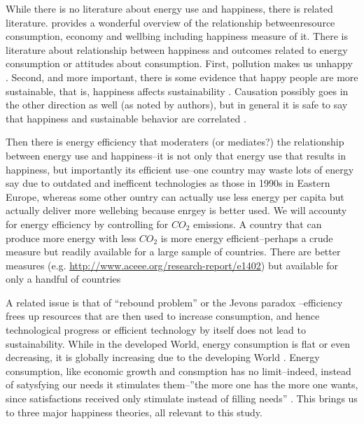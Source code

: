 \documentclass[10pt, letterpaper]{article}
\begin{document}
\begin{spacing}{1.4}
While there is no literature about energy use and happiness, there is related
literature. \citet{pretty13} provides a wonderful overview of the relationship
betweenresource consumption, economy and wellbing including happiness measure of
it. There is literature about relationship between happiness and outcomes
related to energy consumption or attitudes about consumption. First, pollution makes us unhappy \citep{weinhold12,welsch05}. Second,
and more important,  there is some evidence that happy people
are more sustainable, that is, happiness affects sustainability
\citep{ericson14}.  Causation possibly goes in the
other direction as well (as noted by authors), but in general it is
safe to say that happiness and sustainable behavior are correlated  \citep{brown05,corral11}.

Then there is energy efficiency that moderaters (or mediates?) the relationship
between energy use and happiness--it is not only that energy use that results in
happiness, but importantly its efficient use--one country may waste lots of
energy say due to outdated and inefficent technologies as those in 1990s in
Eastern Europe, whereas some other ountry can actually use less energy per
capita but actually deliver more wellebing because enrgey is better used. We
will accounty for  energy efficiency by controlling for  $CO_2$ emissions. 
 A country that can produce more energy with less $CO_2$ is more energy
 efficient--perhaps a crude measure but readily available for a large sample of
 countries. There are better measures (e.g. \url{http://www.aceee.org/research-report/e1402}) but available for only a handful of countries

A related issue is that of ``rebound problem'' or the Jevons paradox
\citep{pretty13}%
--efficiency frees up resources that are then used to increase consumption, and
hence technological progress or efficient technology by itself does not lead to
sustainability. While in the developed World, energy consumption is flat or even
decreasing, it is globally increasing due to the developing World
\citep{pretty13}. Energy consumption, like economic growth and consmption has no
limit--indeed, instead of satysfying our needs it stimulates them--''the more
one has the more one wants, since satisfactions received only stimulate instead
of filling needs''   \citep{durkheim50}. This brings us to three major happiness
theories, all relevant to this study. 


\end{spacing}
\end{document}
